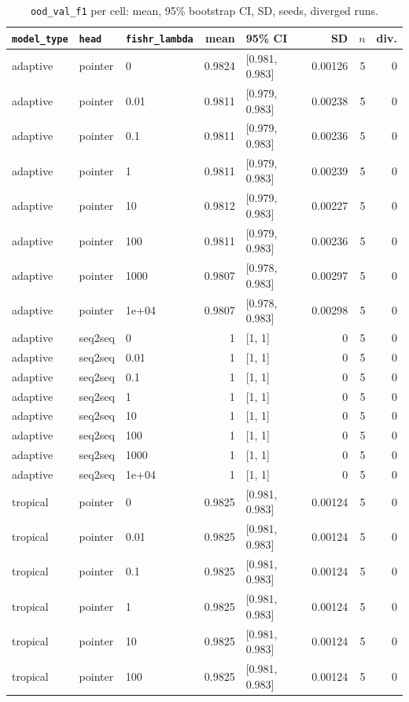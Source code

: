 \documentclass[10pt]{article}
\begin{document}
{\small
\begin{longtable}{lllrlrrr}
\caption{\texttt{ood\_val\_f1} per cell: mean, 95\% bootstrap CI, SD, seeds, diverged runs.}\label{tab:summary-ood_val_f1}\\
\toprule
\texttt{model\_type} & \texttt{head} & \texttt{fishr\_lambda} & mean & 95\% CI & SD & $n$ & div.\\
\midrule
\endhead
adaptive & pointer & 0 & 0.9824 & [0.981, 0.983] & 0.00126 & 5 & 0\\
adaptive & pointer & 0.01 & 0.9811 & [0.979, 0.983] & 0.00238 & 5 & 0\\
adaptive & pointer & 0.1 & 0.9811 & [0.979, 0.983] & 0.00236 & 5 & 0\\
adaptive & pointer & 1 & 0.9811 & [0.979, 0.983] & 0.00239 & 5 & 0\\
adaptive & pointer & 10 & 0.9812 & [0.979, 0.983] & 0.00227 & 5 & 0\\
adaptive & pointer & 100 & 0.9811 & [0.979, 0.983] & 0.00236 & 5 & 0\\
adaptive & pointer & 1000 & 0.9807 & [0.978, 0.983] & 0.00297 & 5 & 0\\
adaptive & pointer & 1e+04 & 0.9807 & [0.978, 0.983] & 0.00298 & 5 & 0\\
adaptive & seq2seq & 0 & 1 & [1, 1] & 0 & 5 & 0\\
adaptive & seq2seq & 0.01 & 1 & [1, 1] & 0 & 5 & 0\\
adaptive & seq2seq & 0.1 & 1 & [1, 1] & 0 & 5 & 0\\
adaptive & seq2seq & 1 & 1 & [1, 1] & 0 & 5 & 0\\
adaptive & seq2seq & 10 & 1 & [1, 1] & 0 & 5 & 0\\
adaptive & seq2seq & 100 & 1 & [1, 1] & 0 & 5 & 0\\
adaptive & seq2seq & 1000 & 1 & [1, 1] & 0 & 5 & 0\\
adaptive & seq2seq & 1e+04 & 1 & [1, 1] & 0 & 5 & 0\\
tropical & pointer & 0 & 0.9825 & [0.981, 0.983] & 0.00124 & 5 & 0\\
tropical & pointer & 0.01 & 0.9825 & [0.981, 0.983] & 0.00124 & 5 & 0\\
tropical & pointer & 0.1 & 0.9825 & [0.981, 0.983] & 0.00124 & 5 & 0\\
tropical & pointer & 1 & 0.9825 & [0.981, 0.983] & 0.00124 & 5 & 0\\
tropical & pointer & 10 & 0.9825 & [0.981, 0.983] & 0.00124 & 5 & 0\\
tropical & pointer & 100 & 0.9825 & [0.981, 0.983] & 0.00124 & 5 & 0\\

\end{longtable}}
\end{document}
